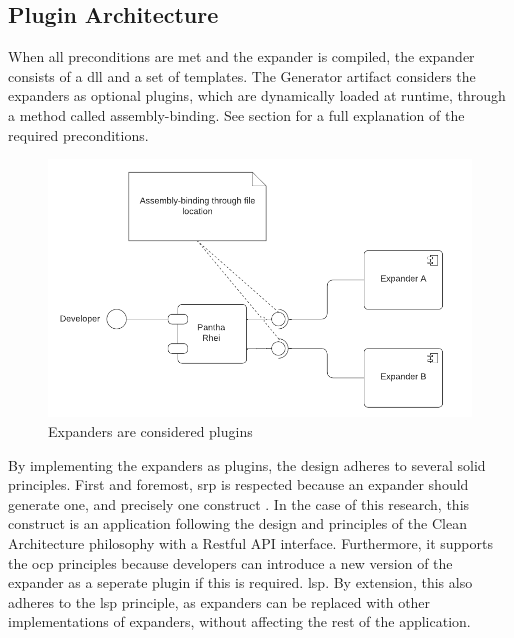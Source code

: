\subsection{Plugin Architecture} \label{subsec:plugin_architecture}

When all preconditions are met and the expander is compiled, the expander consists of a
\gls{dll} and a set of templates. The Generator artifact considers the expanders as
optional plugins, which are dynamically loaded at runtime, through a method called
assembly-binding. See section  for a full explanation of the
required preconditions.

\begin{figure}[H]
  \centering
  \includegraphics[width=1\textwidth]{Figures/plugin_architecture.pdf}
  \caption[Plugin Archticture]{Expanders are considered plugins}
  \label{fi:plugin_architecture}
\end{figure}

By implementing the expanders as plugins, the design adheres to several \gls{solid}
principles. First and foremost, \gls{srp} is respected because an expander should generate
one, and precisely one construct \parencite[403]{mannaert_normalized_2016}. In the case of
this research, this construct is an application following the design and principles of the
Clean Architecture philosophy with a Restful API interface. Furthermore, it supports the
\gls{ocp} principles because developers can introduce a new version of the expander as a
seperate plugin if this is required. \gls{lsp}. By extension, this also adheres to the
\gls{lsp} principle, as expanders can be replaced with other implementations of expanders,
without affecting the rest of the application.